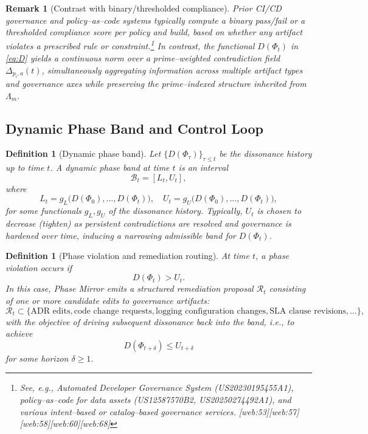 \documentclass[11pt]{article}
\newtheorem{remark}[theorem]{Remark}
\newtheorem{definition}[theorem]{Definition}
\begin{document}
\begin{remark}[Contrast with binary/thresholded compliance]
Prior CI/CD governance and policy--as--code systems typically compute a binary pass/fail or a thresholded compliance score per policy and build, based on whether any artifact violates a prescribed rule or constraint.\footnote{See, e.g., Automated Developer Governance System (US20230195455A1), policy--as--code for data assets (US12587570B2, US20250274492A1), and various intent--based or catalog--based governance services. [web:53][web:57][web:58][web:60][web:68]} In contrast, the functional $D(\Phi_t)$ in \eqref{eq:D} yields a continuous norm over a prime--weighted contradiction field $\Delta_{p_i,a}(t)$, simultaneously aggregating information across multiple artifact types and governance axes while preserving the prime--indexed structure inherited from $\Lambda_m$.
\end{remark}

\subsection{Dynamic Phase Band and Control Loop}

\begin{definition}[Dynamic phase band]\label{def:band}
Let $\{D(\Phi_\tau)\}_{\tau \le t}$ be the dissonance history up to time $t$. A dynamic phase band at time $t$ is an interval
\[
  \mathcal{B}_t = [L_t, U_t],
\]
where
\[
  L_t = g_L\big(D(\Phi_0), \dots, D(\Phi_t)\big), \quad
  U_t = g_U\big(D(\Phi_0), \dots, D(\Phi_t)\big),
\]
for some functionals $g_L,g_U$ of the dissonance history. Typically, $U_t$ is chosen to decrease (tighten) as persistent contradictions are resolved and governance is hardened over time, inducing a narrowing admissible band for $D(\Phi_t)$.
\end{definition}

\begin{definition}[Phase violation and remediation routing]\label{def:violation}
At time $t$, a phase violation occurs if
\[
  D(\Phi_t) > U_t.
\]
In this case, Phase Mirror emits a structured remediation proposal $\mathcal{R}_t$ consisting of one or more candidate edits to governance artifacts:
\[
  \mathcal{R}_t \subset
  \{
    \text{ADR edits},
    \text{code change requests},
    \text{logging configuration changes},
    \text{SLA clause revisions},
    \dots
  \},
\]
with the objective of driving subsequent dissonance back into the band, i.e., to achieve
\[
  D(\Phi_{t+\delta}) \le U_{t+\delta}
\]
for some horizon $\delta \ge 1$.
\end{definition}
\end{document}
